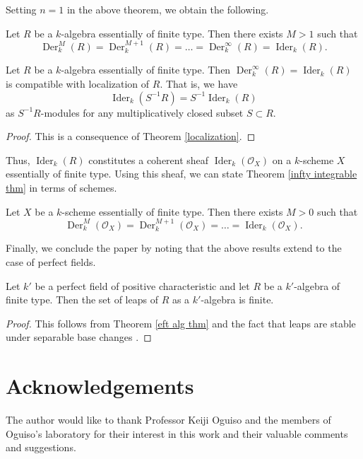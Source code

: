 \documentclass{amsart}
\begin{document}
Setting $n=1$ in the above theorem, we obtain the following.
\begin{theorem}\label{infty integrable thm}
     Let $R$ be a $k$-algebra essentially of finite type. Then there exists $M>1$ such that
     $$ \operatorname{Der}_k^M(R)= \operatorname{Der}_k^{M+1}(R)=\dots= \operatorname{Der}_k^\infty(R)=\operatorname{Ider}_k(R).$$
\end{theorem}

\begin{corollary}\label{localization ider cor}
 Let $R$ be a $k$-algebra essentially of finite type. Then $\operatorname{Der}_k^\infty(R)=\operatorname{Ider}_k(R)$ is compatible with localization of $R$. That is, we have $$\operatorname{Ider}_k(S^{-1}R)=S^{-1}\operatorname{Ider}_k(R)$$
as $S^{-1}R$-modules for any multiplicatively closed subset $S\subset R$.
\end{corollary}
\begin{proof}
    This is a consequence of Theorem \ref{localization}.
\end{proof}

Thus, $\operatorname{Ider}_k(R)$ constitutes a coherent sheaf $\operatorname{Ider}_k(\mathcal{O}_X)$ on a $k$-scheme $X$ essentially of finite type. Using this sheaf, we can state Theorem \ref{infty integrable thm} in terms of schemes.


\begin{theorem}\label{infty integrable thm schemes}
    Let $X$ be a $k$-scheme essentially of finite type. Then there exists $M>0$ such that
$$ \operatorname{Der}_k^M(\mathcal{O}_X)= \operatorname{Der}_k^{M+1}(\mathcal{O}_X)=\dots=\operatorname{Ider}_k(\mathcal{O}_X).$$
\end{theorem}


Finally, we conclude the paper by noting that the above results extend to the case of perfect fields.

\begin{theorem}
    Let $k'$ be a perfect field of positive characteristic and let $R$ be a $k'$-algebra of finite type. Then the set of leaps of $R$ as a $k'$-algebra is finite.
\end{theorem}
\begin{proof}
    This follows from Theorem \ref{eft alg thm} and the fact that leaps are stable under separable base changes \cite[Theorem 3.27]{hernandez2020behavior}.
\end{proof}

\section*{Acknowledgements} The author would like to thank Professor Keiji Oguiso and the members of Oguiso's laboratory for their interest in this work and their valuable comments and suggestions.

\printbibliography
\end{document}
